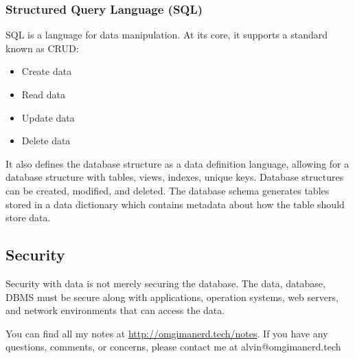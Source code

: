 \documentclass{math}
\begin{document}
\subsubsection*{Structured Query Language (SQL)}
SQL is a language for data manipulation. At its core, it supports a standard
known as CRUD:
\begin{itemize}
  \item Create data
  \item Read data
  \item Update data
  \item Delete data
\end{itemize}
It also defines the database structure as a data definition language, allowing
for a database structure with tables, views, indexes, unique keys. Database
structures can be created, modified, and deleted. The database schema generates
tables stored in a data dictionary which contains metadata about how the table
should store data.

\subsection*{Security}
Security with data is not merely securing the database. The data, database,
DBMS must be secure along with applications, operation systems, web servers,
and network environments that can access the data.

\begin{center}
  You can find all my notes at \url{http://omgimanerd.tech/notes}. If you have
  any questions, comments, or concerns, please contact me at
  alvin@omgimanerd.tech
\end{center}
\end{document}
